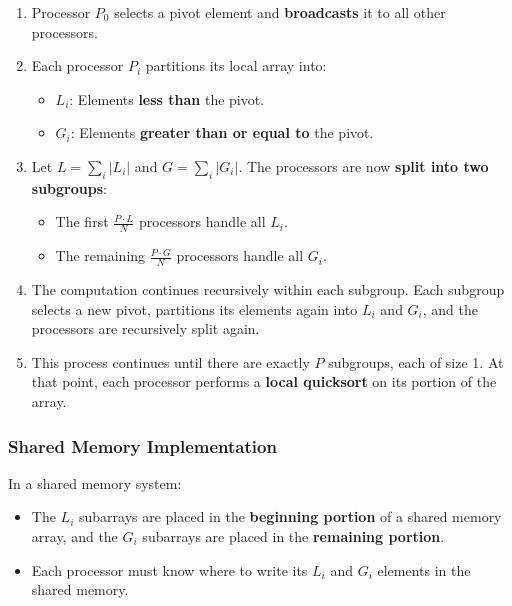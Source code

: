 \documentclass[12pt]{book}
\begin{document}
\begin{enumerate}
    \item Processor $P_0$ selects a pivot element and \textbf{broadcasts} it to all other processors.
    
    \item Each processor $P_i$ partitions its local array into:
    \begin{itemize}
        \item $L_i$: Elements \textbf{less than} the pivot.
        \item $G_i$: Elements \textbf{greater than or equal to} the pivot.
    \end{itemize}
    
    \item Let $L = \sum_i |L_i|$ and $G = \sum_i |G_i|$. The processors are now \textbf{split into two subgroups}:
    \begin{itemize}
        \item The first $\frac{P \cdot L}{N}$ processors handle all $L_i$.
        \item The remaining $\frac{P \cdot G}{N}$ processors handle all $G_i$.
    \end{itemize}
    
    \item The computation continues recursively within each subgroup. Each subgroup selects a new pivot, partitions its elements again into $L_i$ and $G_i$, and the processors are recursively split again.

    \item This process continues until there are exactly $P$ subgroups, each of size 1. At that point, each processor performs a \textbf{local quicksort} on its portion of the array.
\end{enumerate}

\subsubsection{Shared Memory Implementation}

In a shared memory system:

\begin{itemize}
    \item The $L_i$ subarrays are placed in the \textbf{beginning portion} of a shared memory array, and the $G_i$ subarrays are placed in the \textbf{remaining portion}.
    \item Each processor must know where to write its $L_i$ and $G_i$ elements in the shared memory.
\end{itemize}
\end{document}
